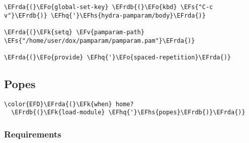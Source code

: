 \documentclass[a4wide,10pt]{article}
\newcommand{\EFs}[1]{\textcolor{EFs}{#1}} %
\newcommand{\EFk}[1]{\textcolor{EFk}{#1}} %
\newcommand{\EFv}[1]{\textcolor{EFv}{#1}} %
\newcommand{\EFo}[1]{\textcolor{EFo}{#1}} %
\newcommand{\EFhq}[1]{\textcolor{EFhq}{#1}} %
\newcommand{\EFhs}[1]{\textcolor{EFhs}{#1}} %
\newcommand{\EFrda}[1]{\textcolor{EFrda}{#1}} %
\newcommand{\EFrdb}[1]{\textcolor{EFrdb}{#1}} %
\begin{document}
\begin{Code}
\begin{Verbatim}
\EFrda{(}\EFo{global-set-key} \EFrdb{(}\EFo{kbd} \EFs{"C-c v"}\EFrdb{)} \EFhq{'}\EFhs{hydra-pamparam/body}\EFrda{)}

\EFrda{(}\EFk{setq} \EFv{pamparam-path} \EFs{"/home/user/dox/pamparam/pamparam.pam"}\EFrda{)}

\EFrda{(}\EFo{provide} \EFhq{'}\EFo{spaced-repetition}\EFrda{)}
\end{Verbatim}
\end{Code}
\subsection{Popes}
\label{sec:org0b52805}
\begin{Code}
\begin{Verbatim}
\color{EFD}\EFrda{(}\EFk{when} home?
  \EFrdb{(}\EFk{load-module} \EFhq{'}\EFhs{popes}\EFrdb{)}\EFrda{)}
\end{Verbatim}
\end{Code}
\subsubsection{Requirements}
\label{sec:org9d45e19}
\end{document}

